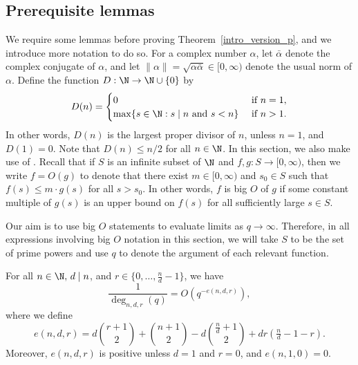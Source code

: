 \subsection{Prerequisite lemmas}


We require some lemmas before proving Theorem~\ref{intro_version_p}, and we introduce more notation to do so.
For a complex number \(\alpha\), let \(\bar{\alpha}\) denote the complex conjugate of \(\alpha\), and let \(\| \alpha \| = \sqrt{\alpha \bar{\alpha}} \in [0,\infty)\) denote the usual norm of \(\alpha\).
Define the function \(D : \N \to \N \cup \{0\}\) by
\begin{equation}
D(n) =
\begin{cases}
0 & \text{ if } n = 1, \\
\max \{ s \in \N : s \mid n \text{ and } s < n\} & \text{ if } n > 1.
\end{cases}
\end{equation}
In other words, \(D(n)\) is the largest proper divisor of \(n\), unless \(n = 1\), and \(D(1) = 0\).
Note that \(D(n) \leq n/2\) for all \(n \in \N\).
In this section, we also make use of .
Recall that if \(S\) is an infinite subset of \(\N\) and \(f,g : S \to [0,\infty)\), then we write \(f = O(g)\) to denote that there exist \(m \in [0,\infty)\) and \(s_0 \in S\) such that \(f(s) \leq m \cdot g(s)\) for all \(s > s_0\).
In other words, \(f\) is big \(O\) of \(g\) if some constant multiple of \(g(s)\) is an upper bound on \(f(s)\) for all sufficiently large \(s \in S\).

\begin{remark}
	Our aim is to use big \(O\) statements to evaluate limits as \(q \to \infty\).
	Therefore, in all expressions involving big \(O\) notation in this section, we will take \(S\) to be the set of prime powers and use \(q\) to denote the argument of each relevant function.
\end{remark}


\begin{lemma}
\label{degree_limit_lemma}
For all \(n \in \N, \, d \mid n\), and \(r \in \{0,\ldots,\tfrac{n}{d}-1\}\), we have
\begin{equation}
\frac{1}{\deg_{n,d,r} (q)}
=
O \left (
q^{-e(n,d,r)}
\right ),
\end{equation}
where we define
\begin{equation}
\label{definition_of_e}
e(n,d,r)
=
d\binom{r+1}{2} + \binom{n+1}{2} - d\binom{\tfrac{n}{d} + 1}{2} + dr\left ( \tfrac{n}{d}-1-r \right ).
\end{equation}
Moreover, \(e(n,d,r)\) is positive unless \(d = 1\) and \(r = 0\), and \(e(n,1,0) = 0\).
\end{lemma}

